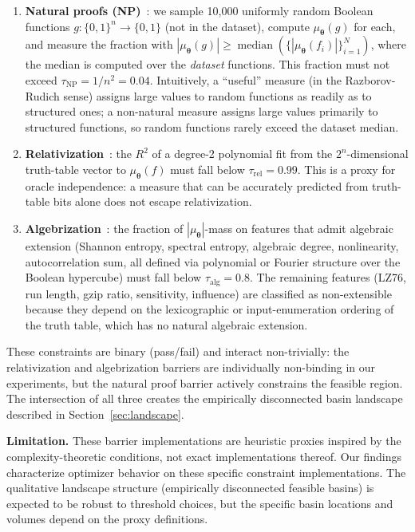 \documentclass[twoside]{article}
\newcommand{\btheta}{\boldsymbol{\theta}}
\begin{document}
\begin{enumerate}
\item \textbf{Natural proofs (NP)}~\citep{razborov1997natural}: we sample 10{,}000
  uniformly random Boolean functions $g : \{0,1\}^n \to \{0,1\}$ (not in the
  dataset), compute $\mu_\btheta(g)$ for each, and measure the fraction with
  $|\mu_\btheta(g)| \geq \operatorname{median}(\{|\mu_\btheta(f_i)|\}_{i=1}^N)$,
  where the median is computed over the \emph{dataset} functions. This fraction
  must not exceed $\tau_{\text{NP}} = 1/n^2 = 0.04$.
  Intuitively, a ``useful'' measure (in the Razborov-Rudich sense) assigns large
  values to random functions as readily as to structured ones; a non-natural measure
  assigns large values primarily to structured functions, so random functions
  rarely exceed the dataset median.

\item \textbf{Relativization}~\citep{baker1975relativizations}: the $R^2$ of a
  degree-2 polynomial fit from the $2^n$-dimensional truth-table vector to
  $\mu_\btheta(f)$ must fall below $\tau_{\text{rel}} = 0.99$. This is a proxy for
  oracle independence: a measure that can be accurately predicted from truth-table
  bits alone does not escape relativization.

\item \textbf{Algebrization}~\citep{aaronson2008algebrization}: the fraction of
  $|\mu_\btheta|$-mass on features that admit algebraic extension
  (Shannon entropy, spectral entropy, algebraic degree, nonlinearity,
  autocorrelation sum, all defined via polynomial or Fourier structure
  over the Boolean hypercube) must fall below $\tau_{\text{alg}} = 0.8$.
  The remaining features (LZ76, run length, gzip ratio, sensitivity,
  influence) are classified as non-extensible because they depend on the
  lexicographic or input-enumeration ordering of the truth table, which has
  no natural algebraic extension.
\end{enumerate}

These constraints are binary (pass/fail) and interact non-trivially: the
relativization and algebrization barriers are individually non-binding in our
experiments, but the natural proof barrier actively constrains the feasible
region. The intersection of all three creates the empirically disconnected basin landscape
described in Section~\ref{sec:landscape}.

\textbf{Limitation.} These barrier implementations are heuristic proxies inspired
by the complexity-theoretic conditions, not exact implementations thereof.
Our findings characterize optimizer behavior on these specific constraint
implementations. The qualitative landscape structure (empirically disconnected feasible basins)
is expected to be robust to threshold choices, but the specific basin locations
and volumes depend on the proxy definitions.
\end{document}

